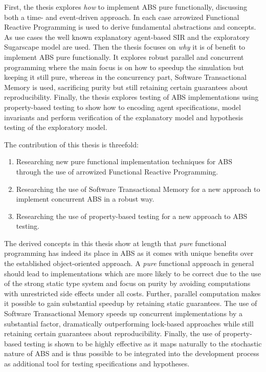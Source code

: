 First, the thesis explores \textit{how} to implement ABS pure functionally, discussing both a time- and event-driven approach. In each case arrowized Functional Reactive Programming is used to derive fundamental abstractions and concepts. As use cases the well known explanatory agent-based SIR and the exploratory Sugarscape model are used. Then the thesis focuses on \textit{why} it is of benefit to implement ABS pure functionally. It explores robust parallel and concurrent programming where the main focus is on how to speedup the simulation but keeping it still pure, whereas in the concurrency part, Software Transactional Memory is used, sacrificing purity but still retaining certain guarantees about reproducibility. Finally, the thesis explores testing of ABS implementations using property-based testing to show how to encoding agent specifications, model invariants and perform verification of the explanatory model and hypothesis testing of the exploratory model.


The contribution of this thesis is threefold:
\begin{enumerate}
	\item Researching new pure functional implementation techniques for ABS \\ through the use of arrowized Functional Reactive Programming.
	\item Researching the use of Software Transactional Memory for a new approach to implement concurrent ABS in a robust way.
	\item Researching the use of property-based testing for a new approach to ABS testing.
\end{enumerate}

The derived concepts in this thesis show at length that \textit{pure} functional programming has indeed its place in ABS as it comes with unique benefits over the established object-oriented approach. A \textit{pure} functional approach in general should lead to implementations which are more likely to be correct due to the use of the strong static type system and focus on purity by avoiding computations with unrestricted side effects under all costs. Further, parallel computation makes it possible to gain substantial speedup by retaining static guarantees. The use of Software Transactional Memory speeds up concurrent implementations by a substantial factor, dramatically outperforming lock-based approaches while still retaining certain guarantees about reproducibility. Finally, the use of property-based testing is shown to be highly effective as it maps naturally to the stochastic nature of ABS and is thus possible to be integrated into the development process as additional tool for testing specifications and hypotheses.

